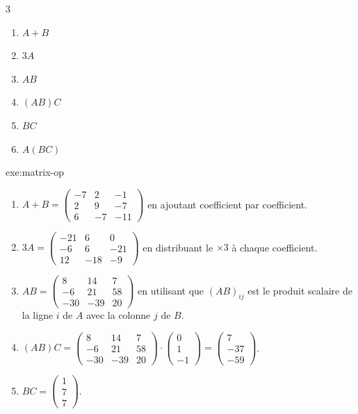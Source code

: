 {	\begin{multicols}{3}
	\begin{enumerate}
		\item $A+B$
		\item $3A$
		\item $AB$
		\item $(AB)C$
		\item $BC$
		\item $A(BC)$
	\end{enumerate}
	\end{multicols}
}{exe:matrix-op}{
	\begin{enumerate}
		\item $A+B = \begin{pmatrix} -7 & 2 & -1 \\ 2 & 9 & -7 \\ 6 & -7 & -11 \end{pmatrix}$ en ajoutant coefficient par coefficient.
		\item $3A = \begin{pmatrix} -21 & 6 & 0 \\ -6 & 6 & -21 \\ 12 & -18 & -9 \end{pmatrix}$ en distribuant le $\times3$ à chaque coefficient.
		\item $AB = \begin{pmatrix} 8 & 14 & 7 \\ -6 & 21 & 58 \\ -30 & -39 & 20 \end{pmatrix}$ en utilisant que $(AB)_{ij}$ est le produit scalaire de la ligne $i$ de $A$ avec la colonne $j$ de $B$.
		\item $(AB)C =  \begin{pmatrix} 8 & 14 & 7 \\ -6 & 21 & 58 \\ -30 & -39 & 20 \end{pmatrix} \cdot \begin{pmatrix} 0 \\ 1 \\ - 1 \end{pmatrix} =  \begin{pmatrix} 7 \\ -37 \\ - 59 \end{pmatrix}$.
		\item $BC = \begin{pmatrix}1\\7\\7\end{pmatrix}$.

\end{enumerate}}

